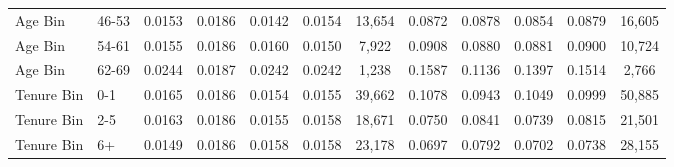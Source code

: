 \begin{tabular}{llccccc|ccccc}
Age Bin&46-53&0.0153&0.0186&0.0142&0.0154&13,654&0.0872&0.0878&0.0854&0.0879&16,605\\
Age Bin&54-61&0.0155&0.0186&0.0160&0.0150&7,922&0.0908&0.0880&0.0881&0.0900&10,724\\
Age Bin&62-69&0.0244&0.0187&0.0242&0.0242&1,238&0.1587&0.1136&0.1397&0.1514&2,766\\
Tenure Bin&0-1&0.0165&0.0186&0.0154&0.0155&39,662&0.1078&0.0943&0.1049&0.0999&50,885\\
Tenure Bin&2-5&0.0163&0.0186&0.0155&0.0158&18,671&0.0750&0.0841&0.0739&0.0815&21,501\\
Tenure Bin&6+&0.0149&0.0186&0.0158&0.0158&23,178&0.0697&0.0792&0.0702&0.0738&28,155\\
\hline\hline
\end{tabular}
